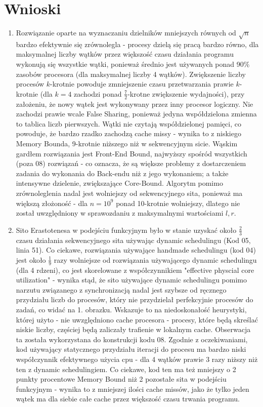 \documentclass[12pt]{article}
\begin{document}
\section{Wnioski}
\begin{enumerate}

	\item Rozwiązanie oparte na wyznaczaniu dzielników mniejszych równych od \(\sqrt{n}\) bardzo efektywnie się zrównolegla - procesy dzielą się pracą bardzo równo, dla maksymalnej liczby wątków przez większość czasu działania programu wykonują się wszystkie wątki, ponieważ średnio jest używanych ponad 90\% zasobów procesora (dla maksymalnej liczby 4 wątków). Zwiększenie liczby procesów \(k\)-krotnie powoduje zmniejszenie czasu przetwarzania prawie \(k\)-krotnie (dla \(k=4\) zachodzi ponad \(\frac{7}{2}\)-krotne zwiększenie wydajności), przy założeniu, że nowy wątek jest wykonywany przez inny procesor logiczny. Nie zachodzi prawie wcale False Sharing, ponieważ jedyna współdzielona zmienna to tablica liczb pierwszych. Wątki nie czytają współdzielonej pamięci, co powoduje, że bardzo rzadko zachodzą cache missy - wynika to z niskiego Memory Bounda, 9-krotnie niższego niż w sekwencyjnym sicie. Wąskim gardłem rozwiązania jest Front-End Bound, najwyższy spośród wszystkich (poza 08) rozwiązań - co oznacza, że są większe problemy z dostarczeniem zadania do wykonania do Back-endu niż z jego wykonaniem; a także intensywne dzielenie, zwiększające Core-Bound. Algorytm pomimo zrównoleglenia nadal jest wolniejszy od sekwencyjnego sita, ponieważ ma większą złożoność - dla \(n=10^9\) ponad 10-krotnie wolniejszy, dlatego nie został uwzględniony w sprawozdaniu z maksymalnymi wartościami \(l, r\).

	\item Sito Erastotenesa w podejściu funkcyjnym było w stanie uzyskać około \(\frac{2}{3}\) czasu działania sekwencyjnego sita używając dynamic schedulingu (Kod 05, linia 51). Co ciekawe, rozwiązania używające handmade schedulingu (kod 04) jest około \(\frac{1}{9}\) razy wolniejsze od rozwiązania używającego dynamic schedulingu (dla 4 rdzeni), co jest skorelowane z współczynnikiem "effective physcial core utilization" - wynika stąd, że sito używające dynamic schedulingu pomimo narzutu związanego z synchronizacją nadal jest szybsze od ręcznego przydziału liczb do procesów, który nie przydzielał perfekcyjnie procesów do zadań, co widać na 1. obrazku. Wskazuje to na niedoskonałość heurystyki, której użyto - nie uwzględniono cache procesora - procesy, które będą skreślać niskie liczby, częściej będą zaliczały trafienie w lokalnym cache. Obserwacja ta została wykorzystana do konstrukcji kodu 08. Zgodnie z oczekiwaniami, kod używający statycznego przydziału iteracji do procesu ma bardzo niski współczynnik efektywnego użycia cpu - dla 4 wątków prawie 3 razy niższy niż ten z dynamic schedulingiem. Co ciekawe, kod ten ma też mniejszy o 2 punkty procentowe Memory Bound niż 2 pozostałe sita w podejściu funkcyjnym - wynika to z mniejszej ilości cache missów, jako że tylko jeden wątek ma dla siebie całe cache przez większość czasu trwania programu.
	

\end{enumerate}
\end{document}
